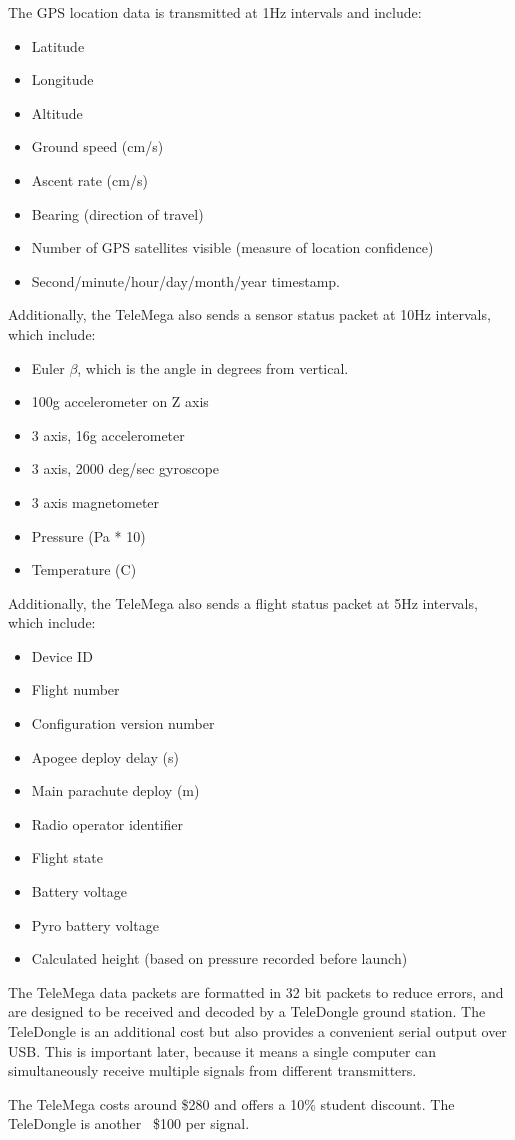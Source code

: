 \documentclass[onecolumn, draftclsnofoot, 10pt, compsoc]{IEEEtran}
\begin{document}
The GPS location data is transmitted at 1Hz intervals and include:
\begin{itemize}
	\item Latitude
    \item Longitude
    \item Altitude
    \item Ground speed (cm/s)
    \item Ascent rate (cm/s)
    \item Bearing (direction of travel)
    \item Number of GPS satellites visible (measure of location confidence)
    \item Second/minute/hour/day/month/year timestamp.
\end{itemize}

Additionally, the TeleMega also sends a sensor status packet at 10Hz intervals, which include:
\begin{itemize}
	\item Euler $\beta$, which is the angle in degrees from vertical.
    \item 100g accelerometer on Z axis
    \item 3 axis, 16g accelerometer
    \item 3 axis, 2000 deg/sec gyroscope
    \item 3 axis magnetometer
    \item Pressure (Pa * 10)
    \item Temperature (C)
\end{itemize}

Additionally, the TeleMega also sends a flight status packet at 5Hz intervals, which include:
\begin{itemize}
	\item Device ID
    \item Flight number
    \item Configuration version number
    \item Apogee deploy delay (s)
    \item Main parachute deploy (m)
    \item Radio operator identifier
    \item Flight state
    \item Battery voltage
    \item Pyro battery voltage
    \item Calculated height (based on pressure recorded before launch)
\end{itemize}

The TeleMega data packets are formatted in 32 bit packets to reduce errors, and are designed to be received and decoded by a TeleDongle ground station.  The TeleDongle is an additional cost but also provides a convenient serial output over USB.  This is important later, because it means a single computer can simultaneously receive multiple signals from different transmitters.

The TeleMega costs around \$280 and offers a 10\% student discount.  The TeleDongle is another ~\$100 per signal.
\end{document}
